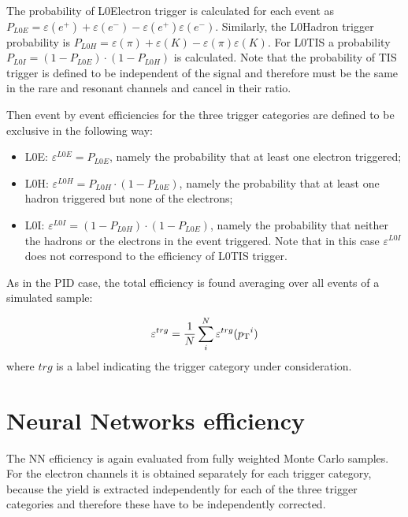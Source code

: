 The probability of L0Electron trigger is calculated for each event as $P_{L0E} = \varepsilon(e^+) + \varepsilon(e^-) - \varepsilon(e^+)\varepsilon(e^-)$.
Similarly, the L0Hadron trigger probability is $P_{L0H} = \varepsilon(\pi) + \varepsilon(K) - \varepsilon(\pi)\varepsilon(K)$.
For L0TIS a probability $P_{L0I} = (1-P_{L0E})\cdot(1-P_{L0H})$ is calculated.
Note that the probability of TIS trigger is defined to be independent of the signal and therefore must
be the same in the rare and resonant channels and cancel in their ratio.

Then event by event efficiencies for the three trigger categories are defined to be exclusive in the following way:
%
\begin{itemize}
\item L0E: $\varepsilon^{L0E} = P_{L0E}$, namely the probability that at least one electron triggered;
\item L0H: $\varepsilon^{L0H} = P_{L0H}\cdot(1 - P_{L0E})$, namely the probability that at least one hadron triggered but none of the electrons;
\item L0I: $\varepsilon^{L0I} = (1-P_{L0H})\cdot(1 - P_{L0E})$, namely the probability that neither the hadrons or the electrons in the event triggered. Note that in this case $\varepsilon^{L0I} $ does not correspond to the efficiency of L0TIS trigger.
\end{itemize}
%
As in the PID case, the total efficiency is found averaging over all events of a simulated sample:

\begin{equation}
\varepsilon^{trg} = \frac{1}{N} \sum_i^N \varepsilon^{trg}(\mbox{$p_{\rm T}$}^i)
\end{equation}
\noindent
where $trg$ is a label indicating the trigger category under consideration.


\section{Neural Networks efficiency}
\label{sec:Rkst_mva_eff}

The NN efficiency is again evaluated from fully weighted Monte Carlo samples. 
For the electron channels it is obtained separately for each trigger category,
because the yield is extracted independently for each of the three trigger categories
and therefore these have to be independently corrected.


